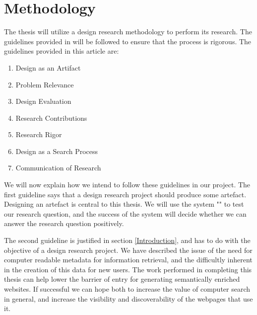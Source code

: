 
\chapter{Methodology} %

\label{Methodology} %


The thesis will utilize a design research methodology to perform its research.
The guidelines provided in \citet{Hevner2004} will be followed to ensure that the process is rigorous.
The guidelines provided in this article are:
\begin{enumerate}
	\item \label{gl1}Design as an Artifact
	\item \label{gl2}Problem Relevance
	\item \label{gl3}Design Evaluation
	\item \label{gl4}Research Contributions
	\item \label{gl5}Research Rigor
	\item \label{gl6}Design as a Search Process
	\item \label{gl7}Communication of Research
\end{enumerate}

We will now explain how we intend to follow these guidelines in our project.
The first guideline says that a design research project should produce some artefact.
Designing an artefact is central to this thesis.
We will use the system "\theartefact" to test our research question,
and the success of the system will decide whether we can answer the research question positively.

The second guideline is justified in section \ref{Introduction}, and has to do with the objective of a design research project.
We have described the issue of the need for computer readable metadata for information retrieval,
and the difficultly inherent in the creation of this data for new users.
The work performed in completing this thesis can help lower the barrier of entry for generating semantically enriched websites.
If successful we can hope both to increase the value of computer search in general, and increase the visibility and
discoverability of the webpages that use it.

